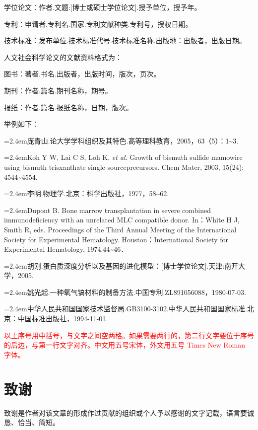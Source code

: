 学位论文：作者.文题:[博士或硕士学位论文].授予单位，授予年。

专\hspace{2em}利：申请者.专利名.国家.专利文献种类.专利号，授权日期。

技术标准：发布单位.技术标准代号.技术标准名称.出版地：出版者，出版日期。

人文社会科学论文的文献资料格式为：

图书：著者.书名.出版者，出版时间，版次，页次。

期刊：作者.篇名.期刊名称，期号。

报纸：作者.篇名.报纸名称，日期，版次。

举例如下：


\begingroup
\zihaowu
\parindent 0pt
\newcommand{\NKTmanualref}[1]{\hangindent=2.4em\noindent #1\par}
\NKTmanualref{[1] 庞青山.论大学学科组织及其特色.高等理科教育，2005，63（5）：1\textasciitilde3.}
\NKTmanualref{[2] Koh Y W, Lai C S, Loh K, \textit{et al}. Growth of bismuth sulfide mamowire using bismuth trisxanthate single sourceprecursors. Chem Mater, 2003, 15(24): 4544\textasciitilde4554.}
\NKTmanualref{[3] 李明.物理学.北京：科学出版社，1977，58\textasciitilde62.}
\NKTmanualref{[4] Dupont B. Bone marrow transplantation in severe combined immunodeficiency with an unrelated MLC compatible donor. In：White H J, Smith R, eds. Proceedings of the Third Annual Meeting of the International Society for Experimental Hematology. Houston：International Society for Experimental Hematology, 1974.44\textasciitilde46．}
\NKTmanualref{[5] 胡刚.蛋白质深度分析以及基因的进化模型：[博士学位论文].天津:南开大学，2005.}
\NKTmanualref{[6] 姚光起.一种氧气镐材料的制备方法.中国专利.ZL891056088，1980-07-03.}
\NKTmanualref{[7] 中华人民共和国国家技术监督局.GB3100-3102.中华人民共和国国家标准.北京：中国标准出版社，1994-11-01.}
\endgroup

\textcolor{red}{以上序号用中括号，与文字之间空两格。如果需要两行的，第二行文字要位于序号的后边，与第一行文字对齐。中文用五号宋体，外文用五号 Times New Roman 字体。}

\section{致谢}

致谢是作者对该文章的形成作过贡献的组织或个人予以感谢的文字记载，语言要诚恳、恰当、简短。


